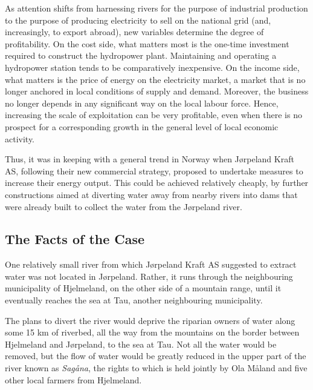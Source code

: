 As attention shifts from harnessing rivers for the purpose of industrial production to the purpose of producing electricity to sell on the national grid (and, increasingly, to export abroad), new variables determine the degree of profitability. On the cost side, what matters most is the one-time investment required to construct the hydropower plant. Maintaining and operating a hydropower station tends to be comparatively inexpensive. On the income side, what matters is the price of energy on the electricity market, a market that is no longer anchored in local conditions of supply and demand. Moreover, the business no longer depends in any significant way on the local labour force. Hence, increasing the scale of exploitation can be very profitable, even when there is no prospect for a corresponding growth in the general level of local economic activity. 

Thus, it was in keeping with a general trend in Norway when Jørpeland Kraft AS, following their new commercial strategy, proposed to undertake measures to increase their energy output. This could be achieved relatively cheaply, by further constructions aimed at diverting water away from nearby rivers into dams that were already built to collect the water from the Jørpeland river.

\subsection{The Facts of the Case}

One relatively small river from which Jørpeland Kraft AS suggested to extract water was not located in Jørpeland. Rather, it runs through the neighbouring municipality of Hjelmeland, on the other side of a mountain range, until it eventually reaches the sea at Tau, another neighbouring municipality. 

The plans to divert the river would deprive the riparian owners of water along some 15 km of riverbed, all the way from the mountains on the border between Hjelmeland and Jørpeland, to the sea at Tau. Not all the water would be removed, but the flow of water would be greatly reduced in the upper part of the river known as {\it Sagåna}, the rights to which is held jointly by Ola Måland and five other local farmers from Hjelmeland.

